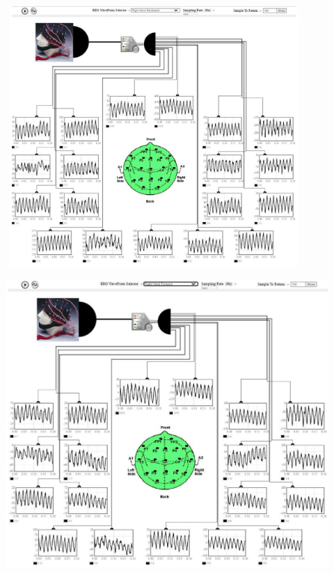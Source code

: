 \documentclass[
  11pt,
  letterpaper,
  DIV=11,
  numbers=noendperiod]{scrreprt}
\begin{document}
\begin{center}
\includegraphics[width=4.44792in,height=3.90625in]{images/clipboard-13240665.png}
\end{center}

\begin{center}
\includegraphics[width=4.83333in,height=\textheight]{images/clipboard-3969083955.png}
\end{center}
\end{document}
